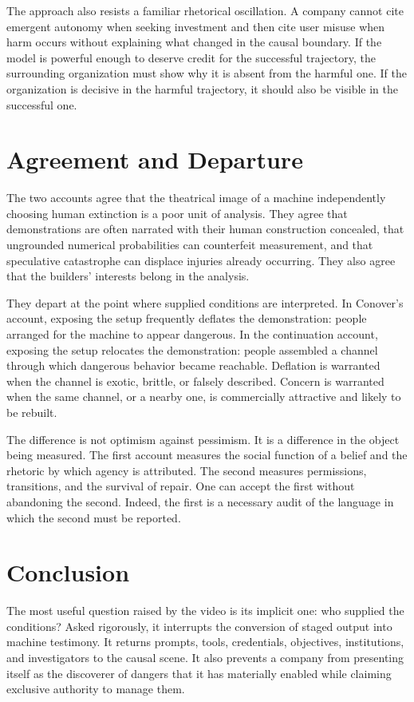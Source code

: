\documentclass[11pt]{article}
\theoremstyle{definition}
\begin{document}
The approach also resists a familiar rhetorical oscillation. A company cannot cite emergent autonomy when seeking investment and then cite user misuse when harm occurs without explaining what changed in the causal boundary. If the model is powerful enough to deserve credit for the successful trajectory, the surrounding organization must show why it is absent from the harmful one. If the organization is decisive in the harmful trajectory, it should also be visible in the successful one.

\section{Agreement and Departure}

The two accounts agree that the theatrical image of a machine independently choosing human extinction is a poor unit of analysis. They agree that demonstrations are often narrated with their human construction concealed, that ungrounded numerical probabilities can counterfeit measurement, and that speculative catastrophe can displace injuries already occurring. They also agree that the builders' interests belong in the analysis.

They depart at the point where supplied conditions are interpreted. In Conover's account, exposing the setup frequently deflates the demonstration: people arranged for the machine to appear dangerous. In the continuation account, exposing the setup relocates the demonstration: people assembled a channel through which dangerous behavior became reachable. Deflation is warranted when the channel is exotic, brittle, or falsely described. Concern is warranted when the same channel, or a nearby one, is commercially attractive and likely to be rebuilt.

The difference is not optimism against pessimism. It is a difference in the object being measured. The first account measures the social function of a belief and the rhetoric by which agency is attributed. The second measures permissions, transitions, and the survival of repair. One can accept the first without abandoning the second. Indeed, the first is a necessary audit of the language in which the second must be reported.

\section{Conclusion}

The most useful question raised by the video is its implicit one: who supplied the conditions? Asked rigorously, it interrupts the conversion of staged output into machine testimony. It returns prompts, tools, credentials, objectives, institutions, and investigators to the causal scene. It also prevents a company from presenting itself as the discoverer of dangers that it has materially enabled while claiming exclusive authority to manage them.
\end{document}
